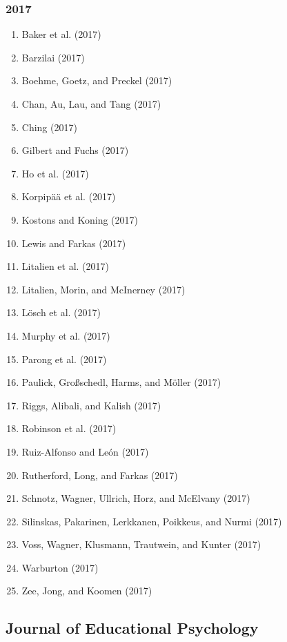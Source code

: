 \documentclass[english,man]{apa6}
\providecommand{\tightlist}{%
  \setlength{\itemsep}{0pt}\setlength{\parskip}{0pt}}
\theoremstyle{definition}
\theoremstyle{definition}
\theoremstyle{definition}
\theoremstyle{remark}
\begin{document}
\subsubsection{2017}\label{section-17}

\begin{enumerate}
\def\labelenumi{\arabic{enumi})}
\tightlist
\item
  Baker et al. (2017)
\item
  Barzilai (2017)
\item
  Boehme, Goetz, and Preckel (2017)
\item
  Chan, Au, Lau, and Tang (2017)
\item
  Ching (2017)
\item
  Gilbert and Fuchs (2017)
\item
  Ho et al. (2017)
\item
  Korpipää et al. (2017)
\item
  Kostons and Koning (2017)
\item
  Lewis and Farkas (2017)
\item
  Litalien et al. (2017)
\item
  Litalien, Morin, and McInerney (2017)
\item
  Lösch et al. (2017)
\item
  Murphy et al. (2017)
\item
  Parong et al. (2017)
\item
  Paulick, Großschedl, Harms, and Möller (2017)
\item
  Riggs, Alibali, and Kalish (2017)
\item
  Robinson et al. (2017)
\item
  Ruiz-Alfonso and León (2017)
\item
  Rutherford, Long, and Farkas (2017)
\item
  Schnotz, Wagner, Ullrich, Horz, and McElvany (2017)
\item
  Silinskas, Pakarinen, Lerkkanen, Poikkeus, and Nurmi (2017)
\item
  Voss, Wagner, Klusmann, Trautwein, and Kunter (2017)
\item
  Warburton (2017)
\item
  Zee, Jong, and Koomen (2017)
\end{enumerate}

\subsection{Journal of Educational
Psychology}\label{journal-of-educational-psychology}
\end{document}
